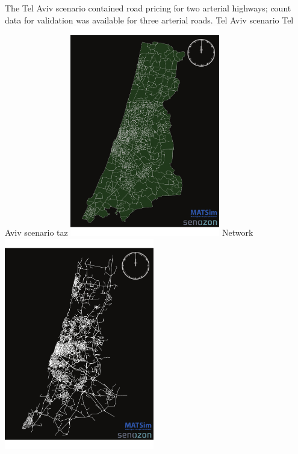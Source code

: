 The Tel Aviv scenario contained road pricing for two arterial highways; count data for validation was available for three arterial roads.
%
\createfigure%
{Tel Aviv scenario}%
{Tel Aviv scenario}%
{\label{fig:telavivscenario}}%
{%
  \createsubfigure%
  {\protect\gls{taz}}%
  {\includegraphics[width=0.49\textwidth,angle=0]{scenarios/figures/TelAviv_TAZ}}%
  {\label{fig:TAZ}}%
  {}%
  \createsubfigure%
  {Network}%
	{\includegraphics[width=0.49\textwidth,angle=0]{scenarios/figures/TelAviv_RoadNetwork}}%
  {\label{fig:network}}%
  {}%
}%
{}

